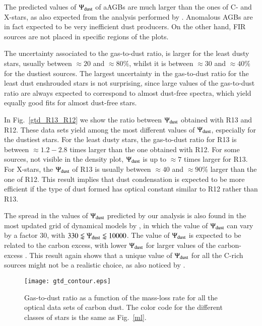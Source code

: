 \documentclass[useAMS,usenatbib]{mn2e/mn2e}
\begin{document}
{The predicted values of $\Psi_{\rm dust}$ of aAGBs are much larger than the ones of C- and X-stars, as also expected from the analysis performed by \citet{Boyer11}. Anomalous AGBs are in fact expected to be very inefficient dust producers. On the other hand, FIR sources are not placed in specific regions of the plots.

The uncertainty associated to the gas-to-dust ratio, is larger for the least dusty stars, usually between $\approx20$ and $\approx80\%$, whilst it is between $\approx30$ and $\approx40\%$ for the dustiest sources.
The largest uncertainty in the gas-to-dust ratio for the least dust enshrouded stars is not surprising, since large values of the gas-to-dust ratio are always expected to correspond to almost dust-free spectra, which yield equally good fits for almost dust-free stars.

In Fig.~\ref{gtd_R13_R12} we show the ratio between $\Psi_{\rm dust}$ obtained with R13 and R12. These data sets yield among the most different values of $\Psi_{\rm dust}$, especially for the dustiest stars. For the least dusty stars, the gas-to-dust ratio for R13 is between $\approx1.2-2.8$ times larger than the one obtained with R12. For some sources, not visible in the density plot, $\Psi_{\rm dust}$ is up to $\approx7$ times larger for R13. For X-stars, the $\Psi_{\rm dust}$ of R13 is usually between $\approx40$ and $\approx90\%$ larger than the one of R12.
This result implies that dust condensation is expected to be more efficient if the type of dust formed has optical constant similar to R12 rather than R13.

The spread in the values of $\Psi_{\rm dust}$ predicted by our analysis is also found in the most updated grid of dynamical models by \citet{Eriksson14}, in which the value of $\Psi_{\rm dust}$ can vary by a factor 30, with $330\lessapprox\Psi_{\rm dust}\lessapprox10000$. 
The value of $\Psi_{\rm dust}$ is expected to be related to the carbon excess, with lower $\Psi_{\rm dust}$ for larger values of the carbon-excess \citep{Mattsson10,Nanni13,Eriksson14}.
This result again shows that a unique value of $\Psi_{\rm dust}$ for all the C-rich sources might not be a realistic choice, as also noticed by \citet{Eriksson14}.

        \begin{figure*}
\texttt{[image: gtd\_contour.eps]}
        \caption{Gas-to-dust ratio as a function of the mass-loss rate for all the optical data sets of carbon dust. The color code for the different classes of stars is the same as Fig.~\ref{ml}.}
        \label{dg}
        \end{figure*}
        
}
\end{document}
